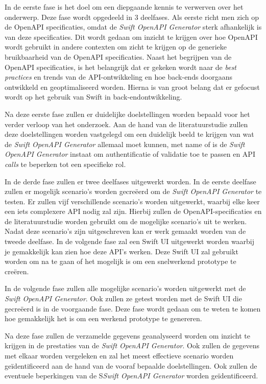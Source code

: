 In de eerste fase is het doel om een diepgaande kennis te verwerven over het onderwerp. Deze fase wordt opgedeeld in 3 deelfases. Als eerste richt men zich op de OpenAPI specificaties, omdat de \textit{Swift OpenAPI Generator} sterk afhankelijk is van deze specificaties. Dit wordt gedaan om inzicht te krijgen over hoe OpenAPI wordt gebruikt in andere contexten om zicht te krijgen op de generieke bruikbaarheid van de OpenAPI specificaties. Naast het begrijpen van de OpenAPI specificaties, is het belangrijk dat er gekeken wordt naar de \textit{best practices} en trends van de API-ontwikkeling en hoe back-ends doorgaans ontwikkeld en geoptimaliseerd worden. Hierna is van groot belang dat er gefocust wordt op het gebruik van Swift in back-endontwikkeling. 

Na deze eerste fase zullen er duidelijke doelstellingen worden bepaald voor het verder verloop van het onderzoek. Aan de hand van de literatuurstudie zullen deze doelstellingen worden vastgelegd om een duidelijk beeld te krijgen van wat de \textit{Swift OpenAPI Generator} allemaal moet kunnen, met name of is de \textit{Swift OpenAPI Generator} instaat om authentificatie of validatie toe te passen en API \textit{calls} te beperken tot een specifieke rol. 

In de derde fase zullen er twee deelfases uitgewerkt worden. In de eerste deelfase zullen er mogelijk scenario's worden gecreëerd om de \textit{Swift OpenAPI Generator} te testen. Er zullen vijf verschillende scenario's worden uitgewerkt, waarbij elke keer een iets complexere API nodig zal zijn. Hierbij zullen de OpenAPI-specificaties en de literatuurstudie worden gebruikt om de mogelijke scenario's uit te werken. Nadat deze scenario’s zijn uitgeschreven kan er werk gemaakt worden van de tweede deelfase. In de volgende fase zal een Swift UI uitgewerkt worden waarbij je gemakkelijk kan zien hoe deze API’s werken. Deze Swift UI zal gebruikt worden om na te gaan of het mogelijk is om een snelwerkend prototype te creëren. 

In de volgende fase zullen alle mogelijke scenario’s worden uitgewerkt met de \textit{Swift OpenAPI Generator}. Ook zullen ze getest worden met de Swift UI die gecreëerd is in de voorgaande fase. Deze fase wordt gedaan om te weten te komen hoe gemakkelijk het is om een werkend prototype te genereren. 

Na deze fase zullen de verzamelde gegevens geanalyseerd worden om inzicht te krijgen in de prestaties van de \textit{Swift OpenAPI Generator}. Ook zullen de gegevens met elkaar worden vergeleken en zal het meest effectieve scenario worden geïdentificeerd aan de hand van de vooraf bepaalde doelstellingen. Ook zullen de eventuele beperkingen van de S\textit{Swift OpenAPI Generator} worden geïdentificeerd.

